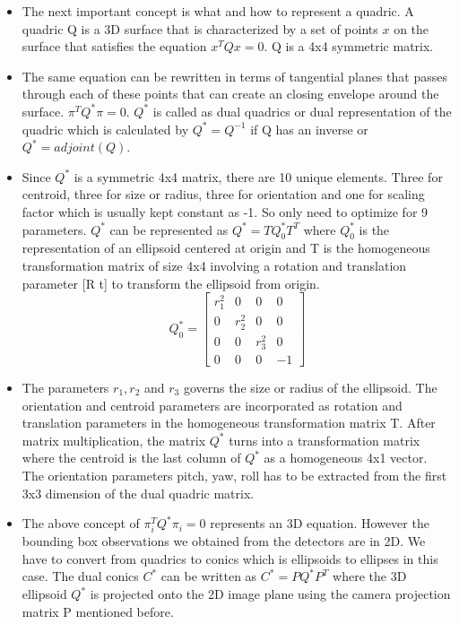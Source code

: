 \documentclass[report.tex]{subfiles}
\begin{document}
\begin{itemize}
\item The next important concept is what and how to represent a quadric. A quadric Q is a 3D surface that is characterized by a set of points $x$ on the surface that satisfies the equation $x^{T}Qx = 0$. Q is a 4x4 symmetric matrix.
\item The same equation can be rewritten in terms of tangential planes that passes through each of these points that can create an closing envelope around the surface. $\pi^{T}Q^{*}\pi = 0$. $Q^{*}$ is called as dual quadrics or dual representation of the quadric which is calculated by $Q^{*} = Q^{-1}$ if Q has an inverse or $Q^{*} = adjoint(Q)$.
\item Since $Q^{*}$ is a symmetric 4x4 matrix, there are 10 unique elements. Three for centroid, three for size or radius, three for orientation and one for scaling factor which is usually kept constant as -1. So only need to optimize for 9 parameters. $Q^{*}$ can be represented as $Q^{*} = T Q^{*}_{0} T^{T}$ where $Q^{*}_{0}$ is the representation of an ellipsoid centered at origin and T is the homogeneous transformation matrix of size 4x4 involving a rotation and translation parameter [R t] to transform the ellipsoid from origin.
$$
 Q^{*}_{0}
 =
  \begin{bmatrix}
   r_1^2 & 0 & 0 & 0 \\
   0 & r_2^2 & 0 & 0 \\
   0 & 0 & r_3^2 & 0 \\
   0 & 0 & 0 & -1
   \end{bmatrix}
$$
\item The parameters $r_1, r_2$ and $r_3$ governs the size or radius of the ellipsoid. The orientation and centroid parameters are incorporated as rotation and translation parameters in the homogeneous transformation matrix T. After matrix multiplication, the matrix $Q^{*}$ turns into a transformation matrix where the centroid is the last column of $Q^{*}$ as a homogeneous 4x1 vector. The orientation parameters pitch, yaw, roll has to be extracted from the first 3x3 dimension of the dual quadric matrix.
\item The above concept of $\pi_{i}^{T}Q^{*}\pi_{i} = 0$ represents an 3D equation. However the bounding box observations we obtained from the detectors are in 2D. We have to convert from quadrics to conics which is ellipsoids to ellipses in this case. The dual conics $C^{*}$ can be written as $C^{*} = P Q^{*} P^{T}$ where the 3D ellipsoid $Q^{*}$ is projected onto the 2D image plane using the camera projection matrix P mentioned before.

\end{itemize}
\end{document}
